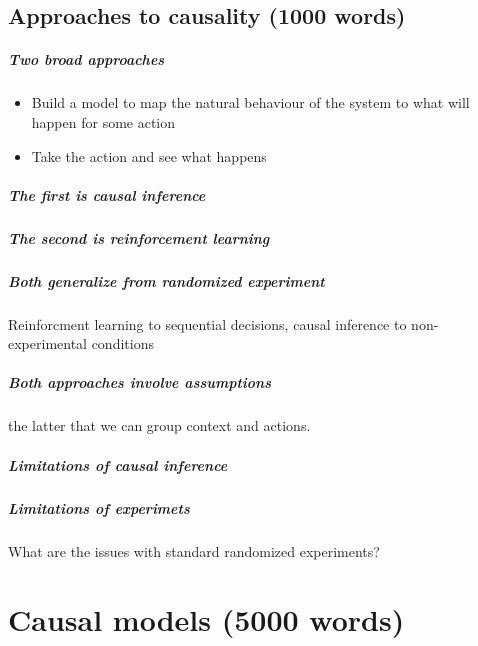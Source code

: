 \documentclass[11pt,a4paper]{book}
\begin{document}
\section*{Approaches to causality (1000 words)}

\paragraph*{Two broad approaches} 
\begin{itemize}
\item Build a model to map the natural behaviour of the system to what will happen for some action
\item Take the action and see what happens
\end{itemize}

\paragraph*{The first is causal inference}

\paragraph*{The second is reinforcement learning}

\paragraph*{Both generalize from randomized experiment} Reinforcment learning to sequential decisions, causal inference to non-experimental conditions

\paragraph*{Both approaches involve assumptions} the latter that we can group context and actions.

\paragraph*{Limitations of causal inference}

\paragraph*{Limitations of experimets} What are the issues with standard randomized experiments?

\chapter*{Causal models (5000 words)}
\end{document}
